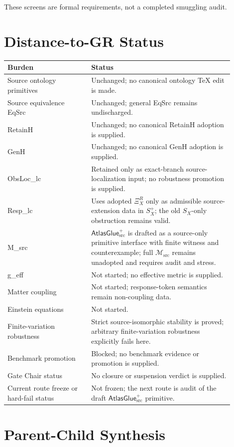 \documentclass[11pt]{article}
\newcommand{\Msrc}{\mathcal{M}_{\mathrm{src}}}
\newcommand{\XiR}{\Xi_X^R}
\newcommand{\SX}{S_X}
\newcommand{\Splus}{S_X^+}
\newcommand{\AtlasGlue}{\mathsf{AtlasGlue}_{\mathrm{src}}^{+}}
\begin{document}
These screens are formal requirements, not a completed smuggling audit.

\section{Distance-to-GR Status}

\begin{center}
\begin{tabular}{p{0.33\linewidth}p{0.57\linewidth}}
\hline
Burden & Status \\
\hline
Source ontology primitives & Unchanged; no canonical ontology TeX edit is made. \\
Source equivalence EqSrc & Unchanged; general EqSrc remains undischarged. \\
RetainH & Unchanged; no canonical RetainH adoption is supplied. \\
GenH & Unchanged; no canonical GenH adoption is supplied. \\
ObsLoc\_lc & Retained only as exact-branch source-localization input; no robustness promotion is supplied. \\
Resp\_lc & Uses adopted \(\XiR\) only as admissible source-extension data in \(\Splus\); the old \(\SX\)-only obstruction remains valid. \\
M\_src & \(\AtlasGlue\) is drafted as a source-only primitive interface with finite witness and counterexample; full \(\Msrc\) remains unadopted and requires audit and stress. \\
g\_eff & Not started; no effective metric is supplied. \\
Matter coupling & Not started; response-token semantics remain non-coupling data. \\
Einstein equations & Not started. \\
Finite-variation robustness & Strict source-isomorphic stability is proved; arbitrary finite-variation robustness explicitly fails here. \\
Benchmark promotion & Blocked; no benchmark evidence or promotion is supplied. \\
Gate Chair status & No closure or suspension verdict is supplied. \\
Current route freeze or hard-fail status & Not frozen; the next route is audit of the draft \(\AtlasGlue\) primitive. \\
\hline
\end{tabular}
\end{center}

\section{Parent-Child Synthesis}
\end{document}
